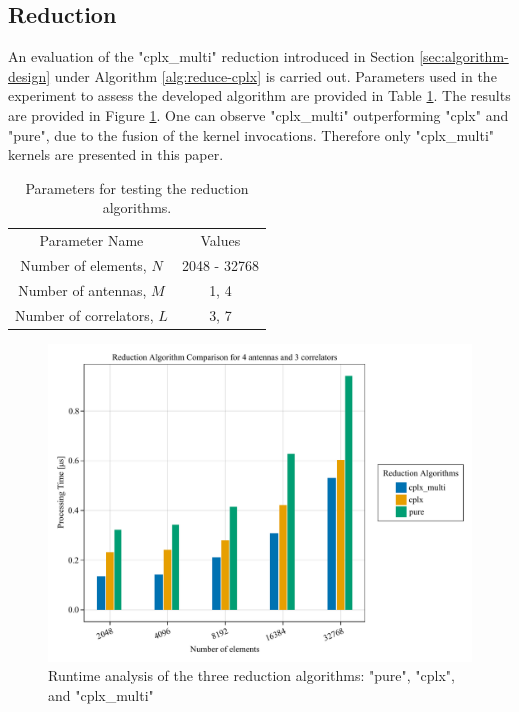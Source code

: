\documentclass{juliacon}
\begin{document}
\subsection*{Reduction}
An evaluation of the "cplx\_multi" reduction introduced in Section \ref{sec:algorithm-design} under Algorithm \ref{alg:reduce-cplx} is carried out. Parameters used in the experiment to assess the developed algorithm are provided in Table \ref{tab:reduction-params}. The results are provided in Figure \ref{fig:reduction-plot}. One can observe "cplx\_multi" outperforming "cplx" and "pure", due to the fusion of the kernel invocations. Therefore only "cplx\_multi" kernels are presented in this paper.

\begin{table}
  \centering
  \caption{\label{tab:reduction-params}Parameters for testing the reduction algorithms.}
  \begin{tabular}{cc}
  \multicolumn{1}{c}{Parameter Name} & \multicolumn{1}{c}{Values}  \vspace{2mm}\\ 
  Number of elements, $N$              & 2048 - 32768               \\
  Number of antennas, $M$               & 1, 4                       \\
  Number of correlators, $L$           & 3, 7                   
  \end{tabular}  
\end{table}
\begin{figure}[h]
  \centering
  \includegraphics[scale=0.6]{reduction.pdf}
  \caption{Runtime analysis of the three reduction algorithms: "pure", "cplx", and "cplx\_multi"}
  \label{fig:reduction-plot}
\end{figure}
\end{document}
